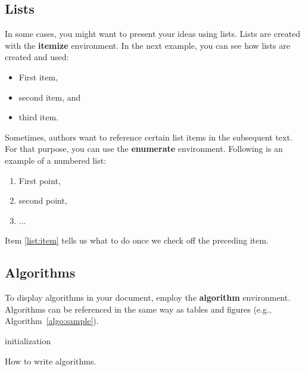 \documentclass[sigconf]{acmart}
\begin{document}
\subsection{Lists}

In some cases, you might want to present your ideas using lists.  Lists are
created with the \textbf{itemize} environment.  In the next example, you can
see how lists are created and used:

\begin{itemize}
    \item First item,
    \item second item, and
    \item third item.
\end{itemize}

Sometimes, authors want to reference certain list items in the subsequent
text.  For that purpose, you can use the \textbf{enumerate} environment.
Following is an example of a numbered list:

\begin{enumerate}
    \item First point,
    \item\label{list:item} second point,
    \item $\ldots$
\end{enumerate}

Item \ref{list:item} tells us what to do once we check off the preceding item.

\subsection{Algorithms}

To display algorithms in your document, employ the \textbf{algorithm}
environment.  Algorithms can be referenced in the same way as tables and
figures (e.g., Algorithm~\ref{algo:sample}).

\begin{algorithm}
    \SetAlgoLined
    initialization\;
    \caption{How to write algorithms.}
    \label{algo:sample}
\end{algorithm}
\end{document}
